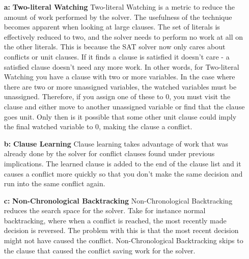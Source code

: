 \documentclass[9pt]{extarticle}
\begin{document}
\begin{homeworkProblem}[Idea]
    \begin{enumerate}
        \item[\textbf{a:}] \textbf{Two-literal Watching}
            Two-literal Watching is a metric to reduce the amount of work performed by the solver. The usefulness of the technique becomes apparent when looking at large clauses. The set of literals is effectively reduced to two, and the solver needs to perform no work at all on the other literals. This is because the SAT solver now only cares about conflicts or unit clauses. If it finds a clause is satisfied it doesn't care - a satisfied clause doesn't need any more work. In other words, for Two-literal
            Watching you have a clause with two or more variables. In the case where there are two or more unassigned variables, the watched variables must be unassigned. Therefore, if you assign one of these to 0, you must visit the clause and either move to another unassigned variable or find that the clause goes unit. Only then is it possible that some other unit clause could imply the final watched variable to 0, making the clause a conflict. 

        \item[\textbf{b:}] \textbf{Clause Learning}
            Clause learning takes advantage of work that was already done by the solver for conflict clauses found under previous implications. The learned clause is added to the end of the clause list and it causes a conflict more quickly so that you don't make the same decision and run into the same conflict again.  

        \item[\textbf{c:}] \textbf{Non-Chronological Backtracking}
            Non-Chronological Backtracking reduces the search space for the solver. Take for instance normal backtracking, where when a conflict is reached, the most recently made decision is reversed. The problem with this is that the most recent decision might not have caused the conflict. Non-Chronological Backtracking skips to the clause that caused the conflict saving work for the solver.
    \end{enumerate}
\end{homeworkProblem}
\end{document}
